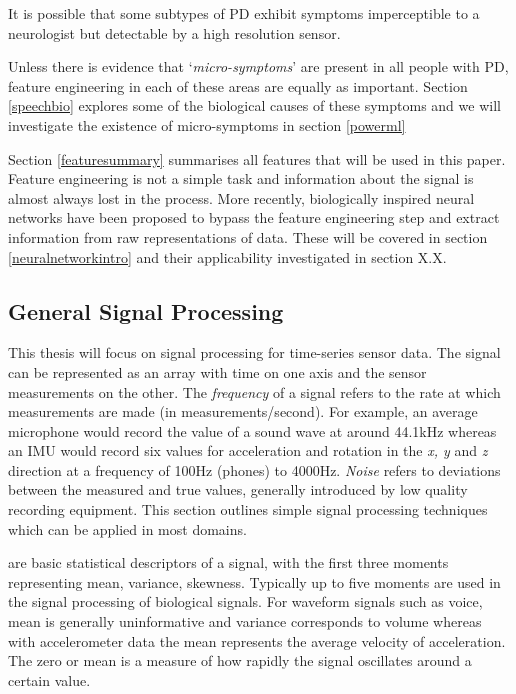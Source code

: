 \documentclass[12pt, twoside]{book}
\renewcommand\emph[1]{\textit{\color{USred}{#1}}}
\begin{document}
\begin{highlight}
It is possible that some subtypes of PD exhibit symptoms imperceptible to a neurologist but detectable by a high resolution sensor. 
\end{highlight}

Unless there is evidence that `\textit{micro-symptoms}' are present in all people with PD, feature engineering in each of these areas are equally as important. Section \ref{speechbio} explores some of the biological causes of these symptoms and we will investigate the existence of  micro-symptoms in section \ref{powerml}


Section \ref{featuresummary} summarises all features that will be used in this paper. Feature engineering is not a simple task and information about the signal is almost always lost in the process. More recently, biologically inspired neural networks have been proposed to bypass the feature engineering step and extract information from raw representations of data. These will be covered in section \ref{neuralnetworkintro} and their applicability investigated in section X.X.

\subsection{General Signal Processing}
\label{generalsignalproc}
This thesis will focus on signal processing for time-series sensor data. The signal can be represented as an array with time on one axis and the sensor measurements on the other. The \textit{frequency} of a signal refers to the rate at which measurements are made (in measurements/second). For example, an average microphone would record the value of a sound wave at around 44.1kHz whereas an IMU would record six values for acceleration and rotation in the \textit{x, y} and \textit{z} direction at a frequency of 100Hz (phones) to 4000Hz. \textit{Noise} refers to deviations between the measured and true values, generally introduced by low quality recording equipment. This section outlines simple signal processing techniques which can be applied in most domains.


\emph{Moments} are basic statistical descriptors of a signal, with the first three moments representing mean, variance, skewness. Typically up to five moments are used in the signal processing of biological signals. For waveform signals such as voice, mean is generally uninformative and variance corresponds to volume whereas with accelerometer data the mean represents the average velocity of acceleration.  The zero or mean \emph{crossing rate} is a measure of how rapidly the signal oscillates around a certain value.
\end{document}
